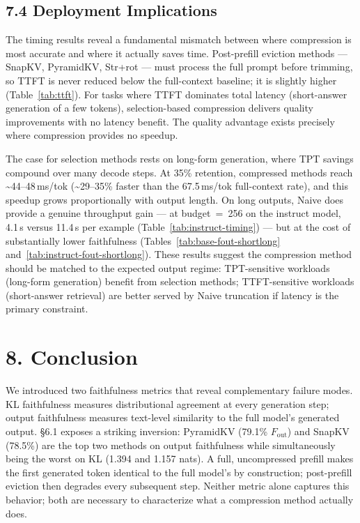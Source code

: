 \documentclass[10pt,letterpaper]{article}
\begin{document}
\subsection{7.4 Deployment Implications}\label{deployment-implications}

The timing results reveal a fundamental mismatch between where compression is most accurate and where it actually saves time. Post-prefill eviction methods --- SnapKV, PyramidKV, Str+rot --- must process the full prompt before trimming, so TTFT is never reduced below the full-context baseline; it is slightly higher (Table~\ref{tab:ttft}). For tasks where TTFT dominates total latency (short-answer generation of a few tokens), selection-based compression delivers quality improvements with no latency benefit. The quality advantage exists precisely where compression provides no speedup.

The case for selection methods rests on long-form generation, where TPT savings compound over many decode steps. At 35\% retention, compressed methods reach \textasciitilde44--48\,ms/tok (\textasciitilde29--35\% faster than the 67.5\,ms/tok full-context rate), and this speedup grows proportionally with output length. On long outputs, Naive does provide a genuine throughput gain --- at budget~=~256 on the instruct model, 4.1\,s versus 11.4\,s per example (Table~\ref{tab:instruct-timing}) --- but at the cost of substantially lower faithfulness (Tables~\ref{tab:base-fout-shortlong} and~\ref{tab:instruct-fout-shortlong}). These results suggest the compression method should be matched to the expected output regime: TPT-sensitive workloads (long-form generation) benefit from selection methods; TTFT-sensitive workloads (short-answer retrieval) are better served by Naive truncation if latency is the primary constraint.

\hypertarget{conclusion}{%
\section{8. Conclusion}\label{conclusion}}

We introduced two faithfulness metrics that reveal complementary failure
modes. KL faithfulness measures distributional agreement at every
generation step; output faithfulness measures text-level similarity to
the full model's generated output. §6.1 exposes a striking inversion:
PyramidKV (79.1\% \(F_{\text{out}}\)) and SnapKV (78.5\%) are the top
two methods on output faithfulness while simultaneously being the worst
on KL (1.394 and 1.157 nats). A full, uncompressed prefill makes the
first generated token identical to the full model's by construction;
post-prefill eviction then degrades every subsequent step. Neither
metric alone captures this behavior; both are necessary to characterize
what a compression method actually does.
\end{document}
